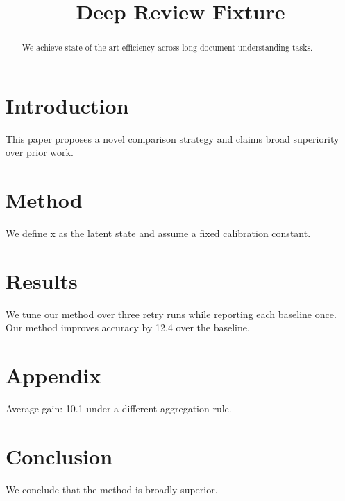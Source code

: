 \documentclass{article}
\title{Deep Review Fixture}
\begin{document}
\begin{abstract}
We achieve state-of-the-art efficiency across long-document understanding tasks.
\end{abstract}
\section{Introduction}
This paper proposes a novel comparison strategy and claims broad superiority over prior work.
\section{Method}
We define x as the latent state and assume a fixed calibration constant.
\section{Results}
We tune our method over three retry runs while reporting each baseline once. Our method improves accuracy by 12.4 over the baseline.
\section{Appendix}
Average gain: 10.1 under a different aggregation rule.
\section{Conclusion}
We conclude that the method is broadly superior.
\end{document}
